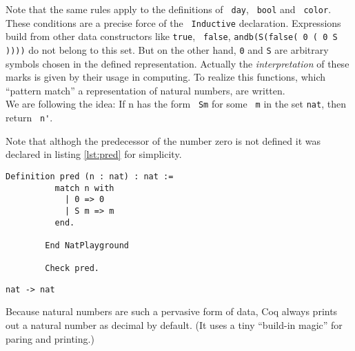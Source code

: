 	  Note that the same rules apply to the definitions of \lstinline! day!, \lstinline! bool! and \lstinline! color!.
	  These conditions are a precise force of the \lstinline! Inductive! declaration. 
	  Expressions build from other data constructors like \lstinline!true!, \lstinline! false!, \lstinline!andb(S(false( 0 ( 0 S ))))! do not belong to this set.  
	  But on the other hand, \lstinline!0! and \lstinline!S! are arbitrary symbols chosen in the defined representation. 
	  Actually the {\itshape interpretation} of these marks is given by their usage in computing.
	  To realize this functions, which ``pattern match'' a representation of natural numbers, are written.\\  
	  We are following the idea:  If n has the form \lstinline! Sm! for some \lstinline! m! in the set \lstinline!nat!, then return  \lstinline! n'!.
	  \begin{example}%
	   {\normalfont 
	   
	   Note that althogh the predecessor of the number zero is not defined it was declared in listing \ref{lst:pred} for simplicity.    
	   
	   \begin{minipage}[t]{0.45\textwidth}
	   \begin{lstlisting}[caption= \lstinline!pred!, label =lst:pred]
	  	Definition pred (n : nat) : nat := 
	  	  match n with 
	   	    | 0 => 0
	   	    | S m => m
	   	  end. 
	   	  
	    End NatPlayground
	   	 
	    Check pred. 
	    \end{lstlisting}
	    \end{minipage}
	    \hfill
	    \begin{minipage}[t]{0.45\textwidth}
	    \begin{lstlisting}[caption= Coq-output]
	     nat -> nat    
	    \end{lstlisting}
	    \end{minipage}
	   
	    
	  \normalfont }
	  \end{example}
	  
	  Because natural numbers are such a pervasive form of data, Coq always prints out a natural number as decimal by default.
	  (It uses a tiny ``build-in magic'' for paring and printing.)
	 
